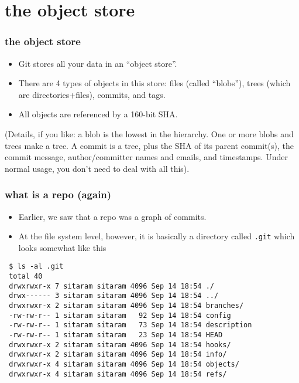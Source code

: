 \documentclass[presentation]{beamer}
\begin{document}
\section{the object store}
\label{sec-7}
\begin{frame}
\frametitle{the object store}
\label{sec-7-1}


\begin{itemize}
\item Git stores all your data in an ``object store''.
\item There are 4 types of objects in this store: files (called ``blobs''),
  trees (which are directories+files), commits, and tags.
\item All objects are referenced by a 160-bit SHA.
\end{itemize}

\tiny
(Details, if you like: a blob is the lowest in the hierarchy.  One or
more blobs and trees make a tree.  A commit is a tree, plus the SHA of
its parent commit(s), the commit message, author/committer names and
emails, and timestamps.  Under normal usage, you don't need to deal
with all this).
\end{frame}
\begin{frame}[fragile]
\frametitle{what is a repo (again)}
\label{sec-7-2}

 
\begin{itemize}
\item Earlier, we saw that a repo was a graph of commits.
\item At the file system level, however, it is basically a directory called
  \texttt{.git} which looks somewhat like this
\end{itemize}

\tiny

\begin{verbatim}
 $ ls -al .git
 total 40
 drwxrwxr-x 7 sitaram sitaram 4096 Sep 14 18:54 ./
 drwx------ 3 sitaram sitaram 4096 Sep 14 18:54 ../
 drwxrwxr-x 2 sitaram sitaram 4096 Sep 14 18:54 branches/
 -rw-rw-r-- 1 sitaram sitaram   92 Sep 14 18:54 config
 -rw-rw-r-- 1 sitaram sitaram   73 Sep 14 18:54 description
 -rw-rw-r-- 1 sitaram sitaram   23 Sep 14 18:54 HEAD
 drwxrwxr-x 2 sitaram sitaram 4096 Sep 14 18:54 hooks/
 drwxrwxr-x 2 sitaram sitaram 4096 Sep 14 18:54 info/
 drwxrwxr-x 4 sitaram sitaram 4096 Sep 14 18:54 objects/
 drwxrwxr-x 4 sitaram sitaram 4096 Sep 14 18:54 refs/
\end{verbatim}
\end{frame}
\end{document}
